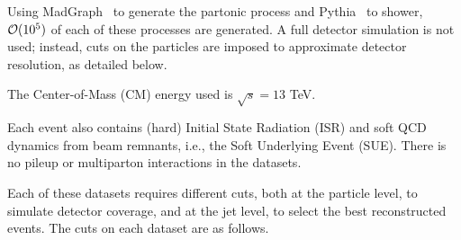     Using MadGraph~\cite{Alwall:2011uj} to generate the partonic process and Pythia~\cite{Sjostrand:2014zea} to shower, ${\cal O}(10^5)$ of each of these processes are generated.
    A full detector simulation is not used; instead, cuts on the particles are imposed to approximate detector resolution, as detailed below. 
    
    The Center-of-Mass (CM) energy used is \(\sqrt{s}=13 \) TeV.

    Each event also contains (hard) Initial State Radiation (ISR) and soft QCD dynamics from beam remnants, i.e., the Soft Underlying Event (SUE).
    There is no pileup or multiparton interactions in the datasets.

    Each of these datasets requires different cuts, both at the particle level, to simulate detector coverage, and at the jet level, to select the best reconstructed events.
    The cuts on each dataset are as follows.
